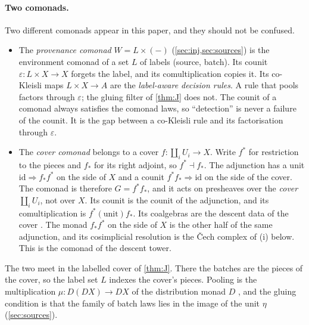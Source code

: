 \documentclass[11pt]{article}
\theoremstyle{definition}\newtheorem{definition}{Definition}\newtheorem{remark}{Remark}
\begin{document}
\paragraph{Two comonads.} Two different comonads appear in this paper, and they should not be confused.
\begin{itemize}
\item The \emph{provenance comonad} $W=L\times(-)$ (\cref{sec:inj,sec:sources}) is the environment comonad of a set $L$ of labels
  (source, batch). Its counit $\varepsilon:L\times X\to X$ forgets the label, and its comultiplication copies it. Its co-Kleisli maps
  $L\times X\to A$ are the \emph{label-aware decision rules}. A rule that pools factors through $\varepsilon$; the gluing filter of
  \cref{thm:J} does not. The counit of a comonad always satisfies the comonad laws, so ``detection'' is never a failure of the counit. It
  is the gap between a co-Kleisli rule and its factorisation through $\varepsilon$.
\item The \emph{cover comonad} belongs to a cover $f:\coprod_iU_i\to X$. Write $f^*$ for restriction to the pieces and $f_*$ for its
  right adjoint, so $f^*\dashv f_*$. The adjunction has a unit $\mathrm{id}\Rightarrow f_*f^*$ on the side of $X$ and a counit
  $f^*f_*\Rightarrow\mathrm{id}$ on the side of the cover. The comonad is therefore $G=f^*f_*$, and it acts on presheaves over the
  \emph{cover} $\coprod_iU_i$, not over $X$. Its counit is the counit of the adjunction, and its comultiplication is
  $f^*(\text{unit})f_*$. Its coalgebras are the descent data of the cover \cite{BenabouRoubaud1970,JanelidzeTholen1994}. The monad
  $f_*f^*$ on the side of $X$ is the other half of the same adjunction, and its cosimplicial resolution is the Čech complex of
  (i) below. This is the comonad of the descent tower.
\end{itemize}
The two meet in the labelled cover of \cref{thm:J}. There the batches are the pieces of the cover, so the label set $L$ indexes the
cover's pieces. Pooling is the multiplication $\mu:D(DX)\to DX$ of the distribution monad $D$ \cite{Giry1982}, and the gluing
condition is that the family of batch laws lies in the image of the unit $\eta$ (\cref{sec:sources}).
\end{document}

